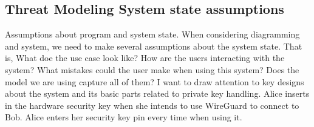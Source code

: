 \documentclass [11pt, proquest] {uwthesis}[2020/02/24]
\begin{document}
\subsection{Threat Modeling System state assumptions}
Assumptions about program and system state. When considering diagramming and system, we need to make several assumptions about the system state. That is, What doe the use case look like? How are the users interacting with the system? What mistakes could the user make when using this system? Does the model we are using capture all of them?
I want to draw attention to key designs about the system and its basic parts related to private key handling.
Alice inserts in the hardware security key when she intends to use WireGuard to connect to Bob. Alice enters her security key pin every time when using it. 




\end{document}
